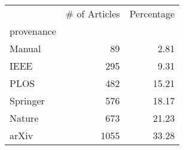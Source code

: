 \begin{tabular}{lrr}
\toprule
{} &  \# of Articles &  Percentage \\
provenance &                &             \\
\midrule
Manual     &             89 &        2.81 \\
IEEE       &            295 &        9.31 \\
PLOS       &            482 &       15.21 \\
Springer   &            576 &       18.17 \\
Nature     &            673 &       21.23 \\
arXiv      &           1055 &       33.28 \\
\bottomrule
\end{tabular}
